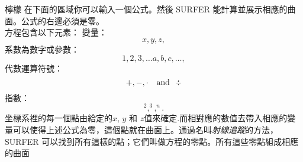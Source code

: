 \begin{surferPage}{檸檬}
在下面的區域你可以輸入一個公式。然後 SURFER 能計算並展示相應的曲面。公式的右邊必須是零。
\\
方程包含以下元素：
\newline
變量：
\[x, y, z, \]
系數為數字或參數：
\[1, 2, 3, \dots a, b, c, \dots, \]
代數運算符號：
\[+,  - , \cdot \quad \textnormal{and}\ \ \div\]
指數：
\[ ^2, ^3, ^n .\]
坐標系裡的每一個點由給定的$x$, $y$ 和 $z$值來確定.而相對應的數值去帶入相應的變量可以使得上述公式為零，這個點就在曲面上。通過名叫\textit{射線追蹤}的方法， SURFER 可以找到所有這樣的點；它們叫做方程的零點。所有這些零點組成相應的曲面
\end{surferPage}
